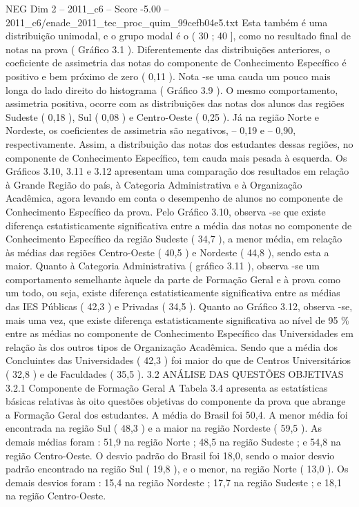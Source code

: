 \begin{textsample}{NEG Dim 2 – 2011\_c6 – Score -5.00 – 2011\_c6/enade\_2011\_tec\_proc\_quim\_99cefb04e5.txt}
Esta também é uma distribuição unimodal, e o grupo modal é o ( 30 ; 40 ], como no resultado final de notas na prova ( Gráfico 3.1 ).
Diferentemente das distribuições anteriores, o coeficiente de assimetria das notas do componente de Conhecimento Específico é positivo e bem próximo de zero ( 0,11 ).
Nota -se uma cauda um pouco mais longa do lado direito do histograma ( Gráfico 3.9 ).
O mesmo comportamento, assimetria positiva, ocorre com as distribuições das notas dos alunos das regiões Sudeste ( 0,18 ), Sul ( 0,08 ) e Centro-Oeste ( 0,25 ).
Já na região Norte e Nordeste, os coeficientes de assimetria são negativos, – 0,19 e – 0,90, respectivamente.
Assim, a distribuição das notas dos estudantes dessas regiões, no componente de Conhecimento Específico, tem cauda mais pesada à esquerda.
Os Gráficos 3.10, 3.11 e 3.12 apresentam uma comparação dos resultados em relação à Grande Região do país, à Categoria Administrativa e à Organização Acadêmica, agora levando em conta o desempenho de alunos no componente de Conhecimento Específico da prova.
Pelo Gráfico 3.10, observa -se que existe diferença estatisticamente significativa entre a média das notas no componente de Conhecimento Específico da região Sudeste ( 34,7 ), a menor média, em relação às médias das regiões Centro-Oeste ( 40,5 ) e Nordeste ( 44,8 ), sendo esta a maior.
Quanto à Categoria Administrativa ( gráfico 3.11 ), observa -se um comportamento semelhante àquele da parte de Formação Geral e à prova como um todo, ou seja, existe diferença estatisticamente significativa entre as médias das IES Públicas ( 42,3 ) e Privadas ( 34,5 ).
Quanto ao Gráfico 3.12, observa -se, mais uma vez, que existe diferença estatisticamente significativa ao nível de 95 \% entre as médias no componente de Conhecimento Específico das Universidades em relação às dos outros tipos de Organização Acadêmica.
Sendo que a média dos Concluintes das Universidades ( 42,3 ) foi maior do que de Centros Universitários ( 32,8 ) e de Faculdades ( 35,5 ). 3.2 ANÁLISE DAS QUESTÕES OBJETIVAS 3.2.1 Componente de Formação Geral A Tabela 3.4 apresenta as estatísticas básicas relativas às oito questões objetivas do componente da prova que abrange a Formação Geral dos estudantes.
A média do Brasil foi 50,4.
A menor média foi encontrada na região Sul ( 48,3 ) e a maior na região Nordeste ( 59,5 ).
As demais médias foram : 51,9 na região Norte ; 48,5 na região Sudeste ; e 54,8 na região Centro-Oeste.
O desvio padrão do Brasil foi 18,0, sendo o maior desvio padrão encontrado na região Sul ( 19,8 ), e o menor, na região Norte ( 13,0 ).
Os demais desvios foram : 15,4 na região Nordeste ; 17,7 na região Sudeste ; e 18,1 na região Centro-Oeste.

\end{textsample}
